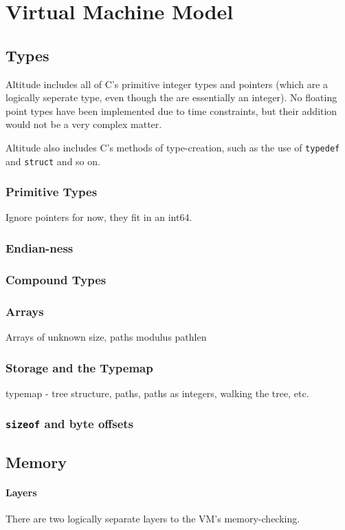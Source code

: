 \chapter{Virtual Machine Model}
\section{Types}
Altitude includes all of C's primitive integer types and pointers (which are a logically seperate type, even though the are essentially an integer). No floating point types have been implemented due to time constraints, but their addition would not be a very complex matter.

Altitude also includes C's methods of type-creation, such as the use of {\tt typedef} and {\tt struct} and so on.
\subsection{Primitive Types}
Ignore pointers for now, they fit in an int64.

\subsection{Endian-ness}

\subsection{Compound Types}

\subsection{Arrays}
Arrays of unknown size, paths modulus pathlen

\subsection{Storage and the Typemap}
typemap - tree structure, paths, paths as integers, walking the tree, etc.

\subsection{{\tt sizeof} and byte offsets}

\section{Memory}
\subsubsection{Layers}
There are two logically separate layers to the VM's memory-checking.

